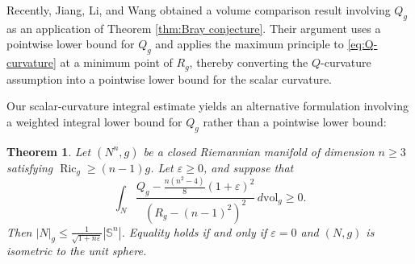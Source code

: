 \documentclass[11pt, reqno]{amsart}
\newtheorem{theorem}{Theorem}
\begin{document}
Recently, Jiang, Li, and Wang obtained a volume comparison result \cite[Theorem 5.1]{JiangLiWang} involving $Q_g$ as an application of Theorem \ref{thm:Bray conjecture}. Their argument uses a pointwise lower bound for $Q_g$ and applies the maximum principle to \eqref{eq:Q-curvature} at a minimum point of $R_g$, thereby converting the $Q$-curvature assumption into a pointwise lower bound for the scalar curvature.

Our scalar-curvature integral estimate yields an alternative formulation involving a weighted integral lower bound for $Q_g$ rather than a pointwise lower bound:
\begin{theorem}\label{thm:integral Q curvature}
Let $(N^n, g)$ be a closed Riemannian manifold of dimension $n\ge 3$ satisfying
$\operatorname{Ric}_g\ge (n-1)g$.
Let $\varepsilon\ge 0$, and suppose that
\begin{equation}\label{eq:integral ass}
\int_N\frac{Q_g-\frac{n(n^2-4)}8(1+\varepsilon)^2}{\left(R_g-(n-1)^2\right)^2}\, d\mathrm{vol}_g\ge 0.
\end{equation}
Then
$|N|_g \le \frac{1}{\sqrt{1+n\varepsilon}}|\mathbb S^n|$.
Equality holds if and only if $\varepsilon=0$ and $(N, g)$ is isometric to the unit sphere.
\end{theorem}
\end{document}
